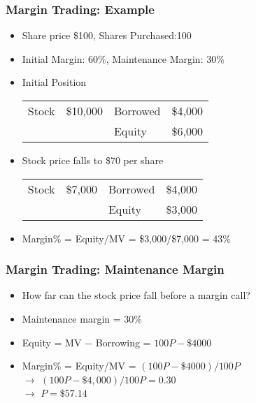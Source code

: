 \documentclass[10pt]{beamer}
\begin{document}
	\begin{frame}
		\frametitle{Margin Trading: Example}
		
		\begin{itemize}
			\item Share price \$100, Shares Purchased:100
			\item Initial Margin: 60\%, Maintenance Margin: 30\%
			\item Initial Position \\
			
			\begin{table}
				\begin{tabular}{lclc} 
					\toprule
					Stock	& \$10,000 	& Borrowed 	& \$4,000 \\
					&			& Equity 	& \$6,000 \\
					\bottomrule
				\end{tabular}
			\end{table}
			
			\item Stock price falls to \$70 per share
			
			\begin{table}
				\begin{tabular}{lclc} 
					\toprule
					Stock	& \$7,000 	& Borrowed 	& \$4,000 \\
					&			& Equity 	& \$3,000 \\
					\bottomrule
				\end{tabular}
			\end{table}
			
			\item Margin\% = Equity/MV = \$3,000/\$7,000 = 43\%
			
			
		\end{itemize}
	\end{frame}
	\begin{frame}
		\frametitle{Margin Trading: Maintenance Margin}
		
		\begin{itemize} \vspace{5pt} \itemsep10pt
			\item How far can the stock price fall before a margin call?
			\item Maintenance margin = 30\%
			\item Equity = MV $-$ Borrowing = $100P - \$4000$
			\item Margin\% = Equity/MV = $(100P - \$4000)/100P$ \\
			\smallskip
			$\rightarrow$ $(100P - \$4,000)/100P = 0.30$ \\
			\smallskip
			$\rightarrow$ $P = \$57.14$
			
		\end{itemize}
		
	\end{frame}
\end{document}
